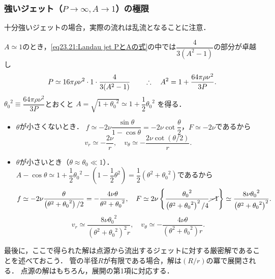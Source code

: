 \subsubsection*{強いジェット（$P\to\infty, A\to1$）の極限}

\begin{details}
十分強いジェットの場合，実際の流れは乱流となることに注意．
\end{details}

$A\simeq1$のとき，\eqref{eq23.21:Landau jet PとAの式}の中では$\dfrac{4}{3(A^2-1)}$の部分が卓越し
\[
    P \simeq 16\pi\rho\nu^2 \cdot 1 \cdot \frac{4}{3(A^2-1)}
    \qquad \therefore\quad
    A^2 = 1 + \frac{64\pi\rho\nu^2}{3P} .
\]
${\theta_0}^2 \equiv \dfrac{64\pi\rho\nu^2}{3P}$とおくと
$A = \sqrt{1 + {\theta_0}^2} \simeq 1 + \dfrac{1}{2}{\theta_0}^2$
を得る．
\begin{itemize}
    \item $\theta$が小さくないとき．
    $f \simeq -2\nu \dfrac{\sin\theta}{1-\cos\theta} = -2\nu \cot\dfrac{\theta}{2}$，$F\simeq -2\nu$であるから
    \begin{equation}
        v_r \simeq - \frac{2\nu}{r}, \quad v_\theta \simeq - \frac{2\nu \cot(\theta/2)}{r} .
    \end{equation}
    \item $\theta$が小さいとき（$\theta\approx\theta_0 \ll 1$）．
    $A-\cos\theta \simeq 1 + \dfrac{1}{2} {\theta_0}^2 - \left( 1-\dfrac{1}{2} \theta^2 \right) = \dfrac{1}{2} \left( \theta^2+{\theta_0}^2 \right)$であるから
    \[
      f \simeq -2\nu \frac{\theta}{\left( \theta^2+{\theta_0}^2 \right)/2} = - \frac{4\nu\theta}{\theta^2+{\theta_0}^2}, \quad
      F \simeq 2\nu \left\{ \frac{{\theta_0}^2}{\left( \theta^2+{\theta_0}^2 \right)^2/4} \cancel{-1}  \right\} 
      \simeq \frac{8\nu{\theta_0}^2}{\left( \theta^2+{\theta_0}^2 \right)^2} .
    \]
    \begin{equation}
        v_r \simeq \frac{8\nu{\theta_0}^2}{\left( \theta^2+{\theta_0}^2 \right)^2 r}, \quad 
        v_\theta \simeq - \frac{4\nu\theta}{\left( \theta^2+{\theta_0}^2 \right) r} .
    \end{equation}
\end{itemize}

最後に，ここで得られた解は点源から流出するジェットに対する厳密解であることを述べておこう．
管の半径$R$が有限である場合，解は$(R/r)$の冪で展開される．
点源の解はもちろん，展開の第1項に対応する．


\BackToTheToc